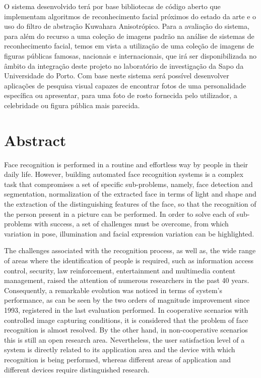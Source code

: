 O sistema desenvolvido terá por base bibliotecas de código aberto que implementam algoritmos de reconhecimento facial próximos do estado da arte e o uso do filtro de abstração Kuwahara Anisotrópico. Para a avaliação do sistema, para além do recurso a uma coleção de imagens padrão na análise de sistemas de reconhecimento facial, temos em vista a utilização de uma coleção de imagens de figuras públicas famosas, nacionais e internacionais, que irá ser disponibilizada no âmbito da integração deste projeto no laboratório de investigação da Sapo da Universidade do Porto. 
Com base neste sistema será possível desenvolver aplicações de pesquisa visual capazes de encontrar fotos de uma personalidade específica ou apresentar, para uma foto de rosto fornecida pelo utilizador, a celebridade ou figura pública mais parecida.

\chapter*{Abstract}
Face recognition is performed in a routine and effortless way by people in their daily life. However, building automated face recognition systems is a complex task that compromises a set of specific sub-problems, namely, face detection and segmentation, normalization of the extracted face in terms of light and shape and the extraction of the distinguishing features of the face, so that the recognition of the person present in a picture can be performed. In order to solve each of sub-problems with success, a set of challenges must be overcome, from which variation in pose, illumination and facial expression variation can be highlighted.

The challenges associated with the recognition process, as well as, the wide range of areas where the identification of people is required, such as information access control, security, law reinforcement, entertainment and multimedia content management, raised the attention of numerous researchers in the past 40 years. Consequently, a remarkable evolution was noticed in terms of system's performance, as can be seen by the two orders of magnitude improvement since 1993, registered in the last evaluation performed. In cooperative scenarios with controlled image capturing conditions, it is considered that the problem of face recognition is almost resolved. By the other hand,  in non-cooperative scenarios this is still an open research area. Nevertheless, the user satisfaction level of a system is directly related to its application area and the device with which recognition is being performed, whereas different areas of application and different devices require distinguished research.

